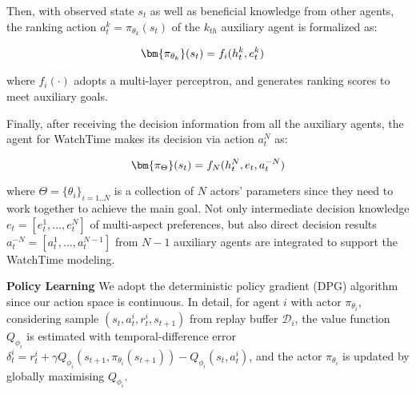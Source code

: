 Then, with observed state $s_t$ as well as beneficial knowledge from other agents, the ranking action $a_t^k = \pi_{\theta_k}(s_t)$ of the $k_{th}$ auxiliary agent is formalized as: 
\begin{small}
\begin{equation} \label{eq10}
\begin{aligned}
\setlength{\abovedisplayskip}{1pt}
&\bm{\pi_{\theta_k}}(s_t) = f_i(h_t^k, e_t^k)
\setlength{\belowdisplayskip}{1pt}
\end{aligned}
\end{equation}
\end{small}
where $f_i(\cdot)$ adopts a multi-layer perceptron, and generates ranking scores to meet auxiliary goals.

Finally, after receiving the decision information from all the auxiliary agents, the agent for WatchTime makes its decision via action $a_t^N$ as:
\begin{small}
\begin{equation} \label{eq2}
\setlength{\abovedisplayskip}{1pt}
\bm{\pi_{\Theta}}(s_t) = f_N(h_t^N, e_t, a_t^{-N})
\setlength{\belowdisplayskip}{1pt}
\end{equation}
\end{small}
where $\Theta = \{\theta_i\}_{i=1..N}$ is a collection of $N$ actors' parameters since they need to work together to achieve the main goal. 
Not only intermediate decision knowledge $e_t = [e_t^1, ... , e_t^N]$ of multi-aspect preferences, but also direct decision results $a_t^{-N} = [a_t^1, ..., a_t^{N-1}]$ from $N-1$ auxiliary agents are integrated to support the WatchTime modeling. 

\textbf{Policy Learning}
We adopt the deterministic policy gradient (DPG) \cite{dpg} algorithm since our action space is continuous. 
In detail, for agent $i$ with actor $\pi_{\theta_i}$, considering sample $(s_t, a_t^i, r_t^i, s_{t+1})$ from replay buffer $\mathcal{D}_i$, the value function $Q_{\phi_i}$ is estimated with temporal-difference error $\delta_t^i = r_t^i + \gamma Q_{\phi_i}(s_{t+1}, \pi_{\theta_i}(s_{t+1}))- Q_{\phi_i}(s_t,a_t^i)$, and the actor $\pi_{\theta_i}$ is updated by globally maximising $Q_{\phi_i}$. 

